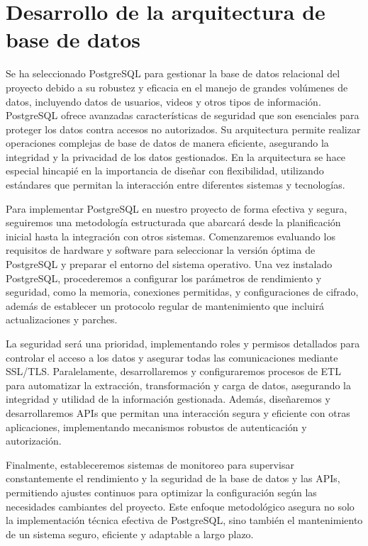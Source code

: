 \section{Desarrollo de la arquitectura de base de datos}

Se ha seleccionado PostgreSQL para gestionar la base de datos relacional del proyecto debido a su robustez y eficacia en el manejo de grandes volúmenes de datos, incluyendo datos de usuarios, videos y otros tipos de información. PostgreSQL ofrece avanzadas características de seguridad que son esenciales para proteger los datos contra accesos no autorizados. Su arquitectura permite realizar operaciones complejas de base de datos de manera eficiente, asegurando la integridad y la privacidad de los datos gestionados. En la arquitectura se hace especial hincapié en la importancia de diseñar con flexibilidad, utilizando estándares que permitan la interacción entre diferentes sistemas y tecnologías.

Para implementar PostgreSQL en nuestro proyecto de forma efectiva y segura, seguiremos una metodología estructurada que abarcará desde la planificación inicial hasta la integración con otros sistemas. Comenzaremos evaluando los requisitos de hardware y software para seleccionar la versión óptima de PostgreSQL y preparar el entorno del sistema operativo. Una vez instalado PostgreSQL, procederemos a configurar los parámetros de rendimiento y seguridad, como la memoria, conexiones permitidas, y configuraciones de cifrado, además de establecer un protocolo regular de mantenimiento que incluirá actualizaciones y parches.

La seguridad será una prioridad, implementando roles y permisos detallados para controlar el acceso a los datos y asegurar todas las comunicaciones mediante SSL/TLS. Paralelamente, desarrollaremos y configuraremos procesos de ETL para automatizar la extracción, transformación y carga de datos, asegurando la integridad y utilidad de la información gestionada. Además, diseñaremos y desarrollaremos APIs que permitan una interacción segura y eficiente con otras aplicaciones, implementando mecanismos robustos de autenticación y autorización.

Finalmente, estableceremos sistemas de monitoreo para supervisar constantemente el rendimiento y la seguridad de la base de datos y las APIs, permitiendo ajustes continuos para optimizar la configuración según las necesidades cambiantes del proyecto. Este enfoque metodológico asegura no solo la implementación técnica efectiva de PostgreSQL, sino también el mantenimiento de un sistema seguro, eficiente y adaptable a largo plazo.

